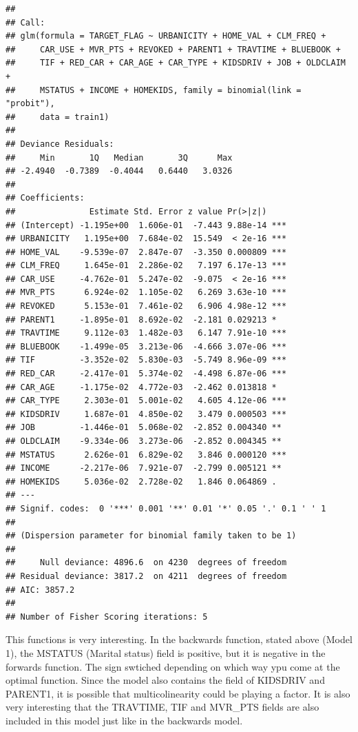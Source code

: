 \documentclass[]{article}
\begin{document}
\begin{verbatim}
## 
## Call:
## glm(formula = TARGET_FLAG ~ URBANICITY + HOME_VAL + CLM_FREQ + 
##     CAR_USE + MVR_PTS + REVOKED + PARENT1 + TRAVTIME + BLUEBOOK + 
##     TIF + RED_CAR + CAR_AGE + CAR_TYPE + KIDSDRIV + JOB + OLDCLAIM + 
##     MSTATUS + INCOME + HOMEKIDS, family = binomial(link = "probit"), 
##     data = train1)
## 
## Deviance Residuals: 
##     Min       1Q   Median       3Q      Max  
## -2.4940  -0.7389  -0.4044   0.6440   3.0326  
## 
## Coefficients:
##               Estimate Std. Error z value Pr(>|z|)    
## (Intercept) -1.195e+00  1.606e-01  -7.443 9.88e-14 ***
## URBANICITY   1.195e+00  7.684e-02  15.549  < 2e-16 ***
## HOME_VAL    -9.539e-07  2.847e-07  -3.350 0.000809 ***
## CLM_FREQ     1.645e-01  2.286e-02   7.197 6.17e-13 ***
## CAR_USE     -4.762e-01  5.247e-02  -9.075  < 2e-16 ***
## MVR_PTS      6.924e-02  1.105e-02   6.269 3.63e-10 ***
## REVOKED      5.153e-01  7.461e-02   6.906 4.98e-12 ***
## PARENT1     -1.895e-01  8.692e-02  -2.181 0.029213 *  
## TRAVTIME     9.112e-03  1.482e-03   6.147 7.91e-10 ***
## BLUEBOOK    -1.499e-05  3.213e-06  -4.666 3.07e-06 ***
## TIF         -3.352e-02  5.830e-03  -5.749 8.96e-09 ***
## RED_CAR     -2.417e-01  5.374e-02  -4.498 6.87e-06 ***
## CAR_AGE     -1.175e-02  4.772e-03  -2.462 0.013818 *  
## CAR_TYPE     2.303e-01  5.001e-02   4.605 4.12e-06 ***
## KIDSDRIV     1.687e-01  4.850e-02   3.479 0.000503 ***
## JOB         -1.446e-01  5.068e-02  -2.852 0.004340 ** 
## OLDCLAIM    -9.334e-06  3.273e-06  -2.852 0.004345 ** 
## MSTATUS      2.626e-01  6.829e-02   3.846 0.000120 ***
## INCOME      -2.217e-06  7.921e-07  -2.799 0.005121 ** 
## HOMEKIDS     5.036e-02  2.728e-02   1.846 0.064869 .  
## ---
## Signif. codes:  0 '***' 0.001 '**' 0.01 '*' 0.05 '.' 0.1 ' ' 1
## 
## (Dispersion parameter for binomial family taken to be 1)
## 
##     Null deviance: 4896.6  on 4230  degrees of freedom
## Residual deviance: 3817.2  on 4211  degrees of freedom
## AIC: 3857.2
## 
## Number of Fisher Scoring iterations: 5
\end{verbatim}

This functions is very interesting. In the backwards function, stated
above (Model 1), the MSTATUS (Marital status) field is positive, but it
is negative in the forwards function. The sign swtiched depending on
which way ypu come at the optimal function. Since the model also
contains the field of KIDSDRIV and PARENT1, it is possible that
multicolinearity could be playing a factor. It is also very interesting
that the TRAVTIME, TIF and MVR\_PTS fields are also included in this
model just like in the backwards model.
\end{document}
